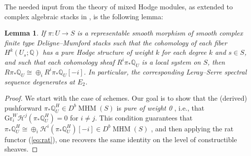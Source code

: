 \documentclass[11pt,reqno]{amsart}
\theoremstyle{plain} %
\newtheorem{lemma}[theorem]{Lemma}
\theoremstyle{definition}
\newcommand{\QQ}{\mathbb{Q}}
\newcommand{\mc}{\mathcal}
\DeclareMathOperator{\MHM}{MHM}
\begin{document}
The needed input from the theory of mixed Hodge modules, as extended to complex algebraic stacks in \cite{Tubach}, is the following lemma:

\begin{lemma}\label{lemma: MHM input}
    If $\pi \colon U \to S$ is a representable smooth morphism of smooth complex finite type Deligne--Mumford stacks such that the cohomology of each fiber $H^k(U_s; \QQ)$ has a pure Hodge structure of weight $k$ for each degree $k$ and $s \in S$, and such that each cohomology sheaf $R^i\pi_* \QQ_U$ is a local system on $S$, then
    $R\pi_* \QQ_U \cong \oplus_i R^i\pi_* \QQ_U[-i]$. In particular, the corresponding Leray--Serre spectral sequence degenerates at $E_2$.
\end{lemma}

\begin{proof}
    We start with the case of schemes.
    Our goal is to show that the (derived) pushforward $\pi_* \QQ^H_U \in D^b\MHM(S)$ is \emph{pure of weight 0} \cite[\S 4.5]{Saito}, i.e., that $\mathrm{Gr}^W_i \mc H^j(\pi_* \QQ^H_U) = 0$ for $i \ne j$. This condition guarantees that $\pi_* \QQ^H_U \cong \oplus_i \mc H^i(\pi_* \QQ^H_U)[-i] \in D^b \MHM(S)$ \cite[(4.5.4)]{Saito}, and then applying the rat functor (\ref{eq:rat}), one recovers the same identity on the level of constructible sheaves.


\end{proof}
\end{document}
